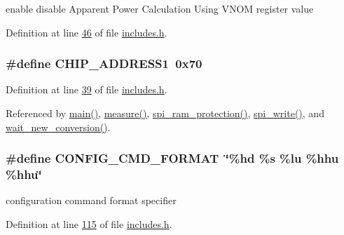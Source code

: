 enable disable Apparent Power Calculation Using V\-N\-O\-M register value 



Definition at line \hyperlink{a00037_source_l00046}{46} of file \hyperlink{a00037_source}{includes.\-h}.

\hypertarget{a00037_a94de2b046db6e10257ef4481c0a15eaa}{
\subsubsection[{C\-H\-I\-P\-\_\-\-A\-D\-D\-R\-E\-S\-S1}]{\setlength{\rightskip}{0pt plus 5cm}\#define C\-H\-I\-P\-\_\-\-A\-D\-D\-R\-E\-S\-S1~0x70}}\label{d1/dc6/a00037_a94de2b046db6e10257ef4481c0a15eaa}


Definition at line \hyperlink{a00037_source_l00039}{39} of file \hyperlink{a00037_source}{includes.\-h}.



Referenced by \hyperlink{a00035_source_l00198}{main()}, \hyperlink{a00042_source_l00040}{measure()}, \hyperlink{a00040_source_l00343}{spi\-\_\-ram\-\_\-protection()}, \hyperlink{a00040_source_l00221}{spi\-\_\-write()}, and \hyperlink{a00035_source_l00122}{wait\-\_\-new\-\_\-conversion()}.

\hypertarget{a00037_a4891d4b97842b3419b2252198ace033f}{
\subsubsection[{C\-O\-N\-F\-I\-G\-\_\-\-C\-M\-D\-\_\-\-F\-O\-R\-M\-A\-T}]{\setlength{\rightskip}{0pt plus 5cm}\#define C\-O\-N\-F\-I\-G\-\_\-\-C\-M\-D\-\_\-\-F\-O\-R\-M\-A\-T~\char`\"{}\%hd \%s \%lu \%hhu \%hhu\char`\"{}}}\label{d1/dc6/a00037_a4891d4b97842b3419b2252198ace033f}


configuration command format specifier 



Definition at line \hyperlink{a00037_source_l00115}{115} of file \hyperlink{a00037_source}{includes.\-h}.



